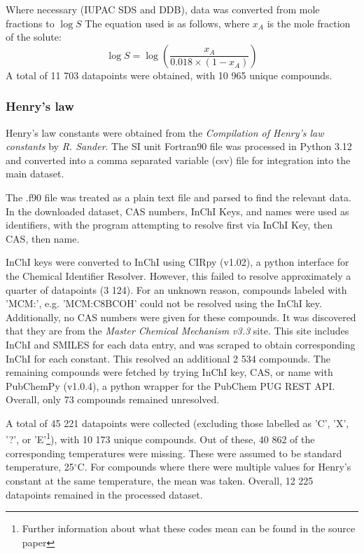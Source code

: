\documentclass[11pt, titlepage]{article}
\begin{document}
Where necessary (IUPAC SDS and DDB), data was converted from mole fractions to $\log S$ The equation used is as follows, where $x_A$ is the mole fraction of the solute:
\begin{equation}
	\log{S} = \log\left(\frac{x_A}{0.018\times(1-x_A)}\right)
\end{equation}
A total of 11 703 datapoints were obtained, with 10 965 unique compounds.

\subsubsection{Henry's law}
\label{subsubsec:HenrysLaw}
Henry's law constants were obtained from the \textit{Compilation of Henry's law constants} by \textit{R. Sander}\cite{Sander}. The SI unit Fortran90 file was processed in Python 3.12 and converted into a comma separated variable (csv) file for integration into the main dataset. 

The .f90 file was treated as a plain text file and parsed to find the relevant data. In the downloaded dataset, CAS numbers, InChI Keys, and names were used as identifiers, with the program attempting to resolve first via InChI Key, then CAS, then name.

InChI keys were converted to InChI using CIRpy (v1.02)\cite{CIRpy}, a python interface for the Chemical Identifier Resolver\cite{CIR}. However, this failed to resolve approximately a quarter of datapoints (3 124). For an unknown reason, compounds labeled with 'MCM:', e.g. 'MCM:C8BCOH' could not be resolved using the InChI key. Additionally, no CAS numbers were given for these compounds. It was discovered that they are from the \textit{Master Chemical Mechanism v3.3} site\cite{UoYMCM}. This site includes InChI and SMILES for each data entry, and was scraped to obtain corresponding InChI for each constant. This resolved an additional 2 534 compounds. The remaining compounds were fetched by trying InChI key, CAS, or name with PubChemPy (v1.0.4), a python wrapper for the PubChem PUG REST API.\cite{PubChemPy} Overall, only 73 compounds remained unresolved.

A total of 45 221 datapoints were collected (excluding those labelled as 'C', 'X', '?', or 'E'\footnote{Further information about what these codes mean can be found in the source paper\cite{Sander}}), with 10 173 unique compounds. Out of these, 40 862 of the corresponding temperatures were missing. These were assumed to be standard temperature, 25$^\circ$C. For compounds where there were multiple values for Henry's constant at the same temperature, the mean was taken. Overall, 12 225 datapoints remained in the processed dataset.
\end{document}
